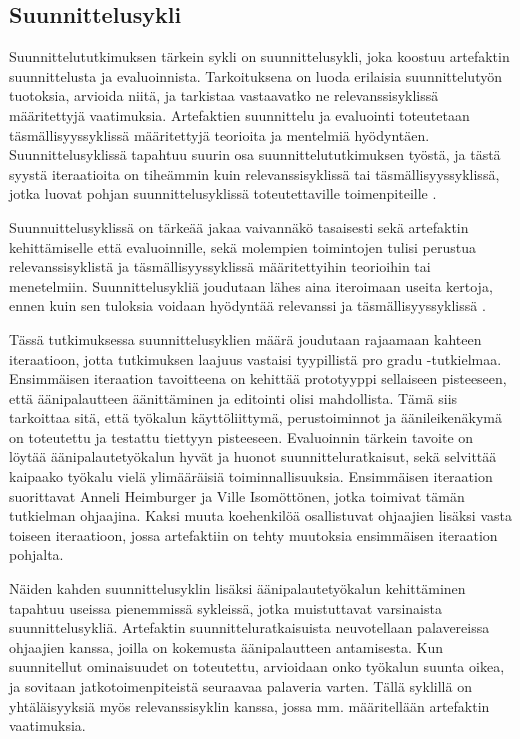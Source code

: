 \documentclass[utf8]{gradu3}
\begin{document}
\subsection{Suunnittelusykli}

Suunnittelututkimuksen tärkein sykli on suunnittelusykli, joka koostuu artefaktin suunnittelusta ja evaluoinnista. Tarkoituksena on luoda erilaisia suunnittelutyön tuotoksia, arvioida niitä, ja tarkistaa vastaavatko ne relevanssisyklissä määritettyjä vaatimuksia. Artefaktien suunnittelu ja evaluointi toteutetaan täsmällisyyssyklissä määritettyjä teorioita ja mentelmiä hyödyntäen. Suunnittelusyklissä tapahtuu suurin osa suunnittelututkimuksen työstä, ja tästä syystä iteraatioita on tiheämmin kuin relevanssisyklissä tai täsmällisyyssyklissä, jotka luovat pohjan suunnittelusyklissä toteutettaville toimenpiteille \parencite[][]{cycles}.

Suunnuittelusyklissä on tärkeää jakaa vaivannäkö tasaisesti sekä artefaktin kehittämiselle että evaluoinnille, sekä molempien toimintojen tulisi perustua relevanssisyklistä ja täsmällisyyssyklissä määritettyihin teorioihin tai menetelmiin. Suunnittelusykliä joudutaan lähes aina iteroimaan useita kertoja, ennen kuin sen tuloksia voidaan hyödyntää relevanssi ja täsmällisyyssyklissä \parencite[][]{cycles}.

Tässä tutkimuksessa suunnittelusyklien määrä joudutaan rajaamaan kahteen iteraatioon, jotta tutkimuksen laajuus vastaisi tyypillistä pro gradu -tutkielmaa. Ensimmäisen iteraation tavoitteena on kehittää prototyyppi sellaiseen pisteeseen, että äänipalautteen äänittäminen ja editointi olisi mahdollista. Tämä siis tarkoittaa sitä, että työkalun käyttöliittymä, perustoiminnot ja äänileikenäkymä on toteutettu ja testattu tiettyyn pisteeseen. Evaluoinnin tärkein tavoite on löytää äänipalautetyökalun hyvät ja huonot suunnitteluratkaisut, sekä selvittää kaipaako työkalu vielä ylimääräisiä toiminnallisuuksia. Ensimmäisen iteraation suorittavat Anneli Heimburger ja Ville Isomöttönen, jotka toimivat tämän tutkielman ohjaajina. Kaksi muuta koehenkilöä osallistuvat ohjaajien lisäksi vasta toiseen iteraatioon, jossa artefaktiin on tehty muutoksia ensimmäisen iteraation pohjalta.

Näiden kahden suunnittelusyklin lisäksi äänipalautetyökalun kehittäminen tapahtuu useissa pienemmissä sykleissä, jotka muistuttavat varsinaista suunnittelusykliä. Artefaktin suunnitteluratkaisuista neuvotellaan palavereissa ohjaajien kanssa, joilla on kokemusta äänipalautteen antamisesta. Kun suunnitellut ominaisuudet on toteutettu, arvioidaan onko työkalun suunta oikea, ja sovitaan jatkotoimenpiteistä seuraavaa palaveria varten. Tällä syklillä on yhtäläisyyksiä myös relevanssisyklin kanssa, jossa mm. määritellään artefaktin vaatimuksia.
\end{document}

